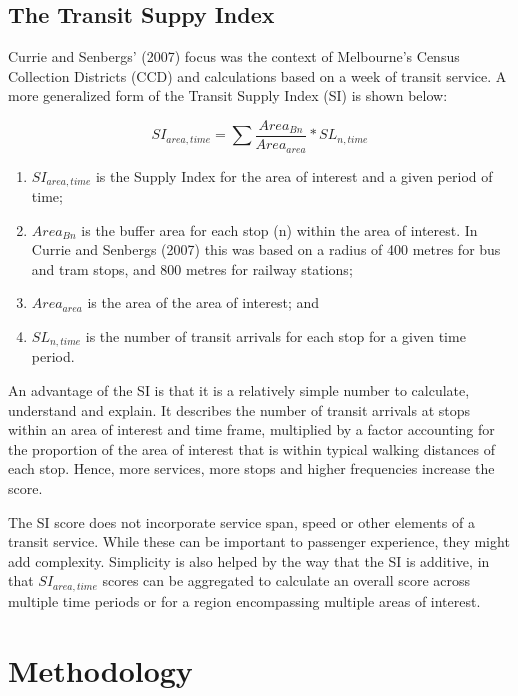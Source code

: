 \documentclass[preprint, 3p,
authoryear]{elsarticle} %
\providecommand{\tightlist}{%
  \setlength{\itemsep}{0pt}\setlength{\parskip}{0pt}}
\begin{document}
\hypertarget{the-transit-suppy-index}{%
\subsection{The Transit Suppy Index}\label{the-transit-suppy-index}}

Currie and Senbergs' (2007) focus was the context of Melbourne's Census
Collection Districts (CCD) and calculations based on a week of transit
service. A more generalized form of the Transit Supply Index (SI) is
shown below:

\[SI_{area, time} = \sum{\frac{Area_{Bn}}{Area_{area}}*SL_{n, time}}\]

\begin{enumerate}
\def\labelenumi{(\arabic{enumi})}
\tightlist
\item
  \(SI_{area, time}\) is the Supply Index for the area of interest and a
  given period of time;
\item
  \(Area_{Bn}\) is the buffer area for each stop (n) within the area of
  interest. In Currie and Senbergs (2007) this was based on a radius of
  400 metres for bus and tram stops, and 800 metres for railway
  stations;
\item
  \(Area_{area}\) is the area of the area of interest; and
\item
  \(SL_{n,time}\) is the number of transit arrivals for each stop for a
  given time period.
\end{enumerate}

An advantage of the SI is that it is a relatively simple number to
calculate, understand and explain. It describes the number of transit
arrivals at stops within an area of interest and time frame, multiplied
by a factor accounting for the proportion of the area of interest that
is within typical walking distances of each stop. Hence, more services,
more stops and higher frequencies increase the score.

The SI score does not incorporate service span, speed or other elements
of a transit service. While these can be important to passenger
experience, they might add complexity. Simplicity is also helped by the
way that the SI is additive, in that \(SI_{area, time}\) scores can be
aggregated to calculate an overall score across multiple time periods or
for a region encompassing multiple areas of interest.

\hypertarget{methodology}{%
\section{Methodology}\label{methodology}}
\end{document}
